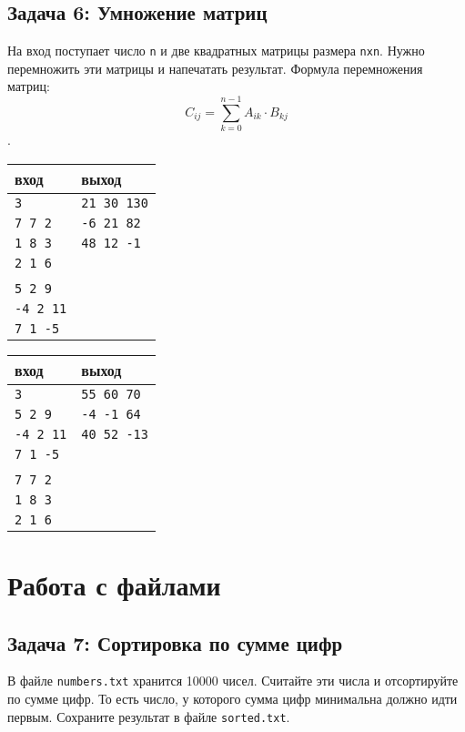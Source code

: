\documentclass{article}
\begin{document}
\subsection*{Задача 6: Умножение матриц}
На вход поступает число \texttt{n} и две квадратных матрицы размера \texttt{nxn}. Нужно перемножить эти матрицы и напечатать результат. Формула перемножения матриц:
$$
C_{ij} = \sum\limits_{k=0}^{n-1} A_{ik} \cdot B_{kj}
$$.
\begin{multicols}{2}
\begin{center}
\begin{tabular}{ l | l }
 вход & выход \\ \hline
 \texttt{3} &     \texttt{21 30 130}  \\ 
 \texttt{7 7 2} & \texttt{-6 21 82}  \\
 \texttt{1 8 3} & \texttt{48 12 -1}  \\ 
 \texttt{2 1 6} &  \\ 
 \texttt{} &  \\
 \texttt{5 2 9} &  \\
 \texttt{-4 2 11} &  \\ 
 \texttt{7 1 -5} &  \\ 
\end{tabular}
\end{center}

\begin{center}
\begin{tabular}{ l | l }
 вход & выход \\ \hline
 \texttt{3} &     \texttt{55 60 70}  \\ 
 \texttt{5 2 9} & \texttt{-4 -1 64}  \\
 \texttt{-4 2 11} & \texttt{40 52 -13}  \\ 
 \texttt{7 1 -5} &  \\ 
 \texttt{} &  \\
 \texttt{7 7 2} &  \\
 \texttt{1 8 3} &  \\ 
 \texttt{2 1 6} &  \\ 
\end{tabular}
\end{center}
\end{multicols}
 
 
\newpage 
\section*{Работа с файлами} 
\subsection*{Задача 7: Сортировка по сумме цифр}
В файле \texttt{numbers.txt} хранится 10000 чисел. Считайте эти числа и отсортируйте по сумме цифр. То есть число, у которого сумма цифр минимальна должно идти первым. Сохраните результат в файле \texttt{sorted.txt}.
\end{document}
